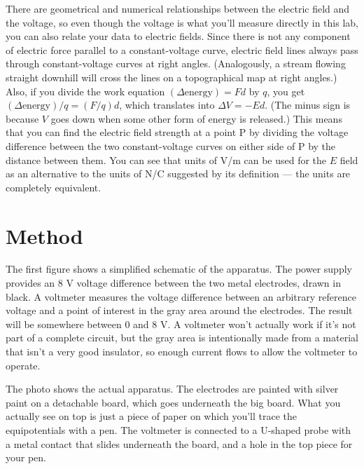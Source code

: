 There are geometrical and numerical relationships between
the electric field and the voltage, so even though the
voltage is what you'll measure directly in this lab, you can
also relate your data to electric fields. Since there is not
any component of electric force parallel to a constant-voltage
curve, electric field lines always pass through constant-voltage
curves at right angles. (Analogously, a stream flowing
straight downhill will cross the lines on a topographical
map at right angles.) Also, if you divide the work equation $(\Delta\text{energy})=Fd$ by
$q$, you get $(\Delta\text{energy})/q=(F/q)d$, which translates into $\Delta V=-Ed$.
(The minus sign is because $V$ goes down when some other form of energy is released.)
This means that you
can find the electric field strength at a point P by
dividing the voltage difference between the two constant-voltage
curves on either side of P by the distance between them.
You can see that units of V/m can be used for the $E$ field
as an alternative to the units of N/C suggested by its
definition --- the units are completely equivalent.



\section*{Method}

The first figure shows a simplified schematic of the apparatus. The power supply
provides an 8 V voltage difference between the two metal electrodes, drawn in black.
A voltmeter measures the voltage difference between an arbitrary reference voltage and
a point of interest in the gray area around the electrodes. The result will be somewhere
between 0 and 8 V. A voltmeter won't actually work if it's not part of a complete circuit,
but the gray area is intentionally made from a material that isn't a very good insulator,
so enough current flows to allow the voltmeter to operate.

The photo shows the actual apparatus. The electrodes are painted with silver paint on a detachable
board, which goes underneath the big board. What you actually see on top is just a piece of
paper on which you'll trace the equipotentials with a pen. The voltmeter is connected to
a U-shaped probe with a metal contact that slides underneath the board, and a hole in the
top piece for your pen. 

